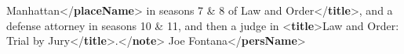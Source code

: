 \begin{shaded}
\hspace*{1em}\hspace*{1em}Manhattan{</\textbf{placeName}>} in seasons 7 \& 8 of\mbox{}\newline 
\hspace*{1em}\hspace*{1em}Law and Order{</\textbf{title}>}, and a defense attorney in seasons\mbox{}\newline 
\hspace*{1em}\hspace*{1em}\hspace*{1em}\hspace*{1em}\hspace*{1em}\hspace*{1em} 10 \& 11, and then a judge in {<\textbf{title}>}Law and Order: Trial by\mbox{}\newline 
\hspace*{1em}\hspace*{1em}\hspace*{1em}\hspace*{1em}\hspace*{1em}\hspace*{1em}\hspace*{1em}\hspace*{1em} Jury{</\textbf{title}>}.{</\textbf{note}>}\mbox{}\newline 
\hspace*{1em}\mbox{}\newline 
\hspace*{1em}\mbox{}\newline 
\hspace*{1em}\hspace*{1em}Joe Fontana{</\textbf{persName}>}\mbox{}\newline 
\hspace*{1em}\hspace*{1em}\mbox{}\newline 
\hspace*{1em}\hspace*{1em}\hspace*{1em}\mbox{}\newline 

\end{shaded}
